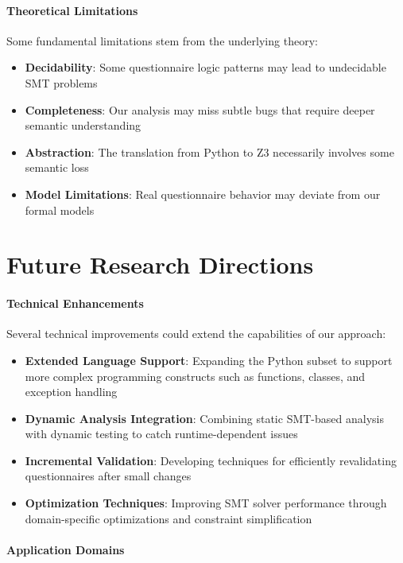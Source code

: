 \paragraph{Theoretical Limitations}

Some fundamental limitations stem from the underlying theory:

\begin{itemize}
    \item \textbf{Decidability}: Some questionnaire logic patterns may lead to undecidable SMT problems
    \item \textbf{Completeness}: Our analysis may miss subtle bugs that require deeper semantic understanding
    \item \textbf{Abstraction}: The translation from Python to Z3 necessarily involves some semantic loss
    \item \textbf{Model Limitations}: Real questionnaire behavior may deviate from our formal models
\end{itemize}

\section{Future Research Directions}

\paragraph{Technical Enhancements}

Several technical improvements could extend the capabilities of our approach:

\begin{itemize}
    \item \textbf{Extended Language Support}: Expanding the Python subset to support more complex programming constructs such as functions, classes, and exception handling
    \item \textbf{Dynamic Analysis Integration}: Combining static SMT-based analysis with dynamic testing to catch runtime-dependent issues
    \item \textbf{Incremental Validation}: Developing techniques for efficiently revalidating questionnaires after small changes
    \item \textbf{Optimization Techniques}: Improving SMT solver performance through domain-specific optimizations and constraint simplification
\end{itemize}

\paragraph{Application Domains}

